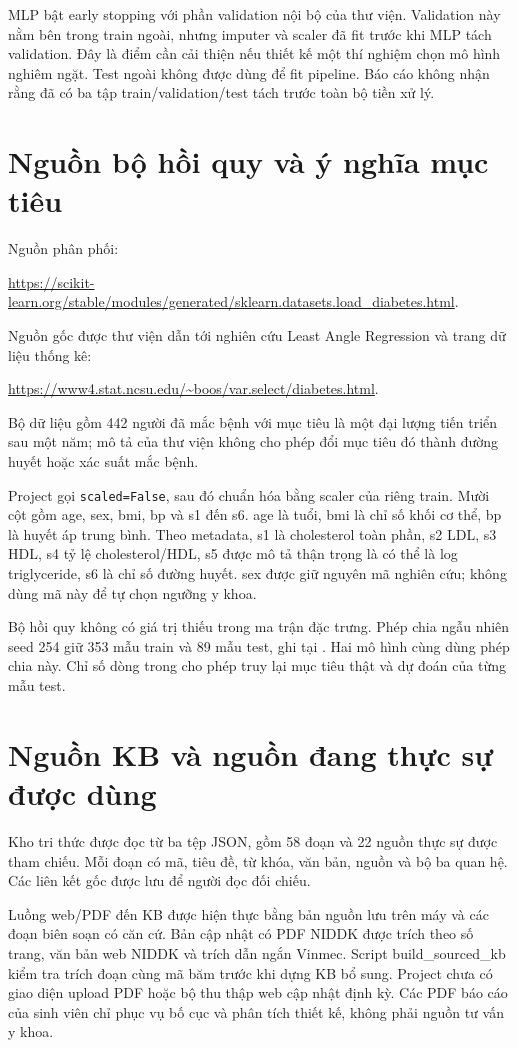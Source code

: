 MLP bật early stopping với phần validation nội bộ của thư viện. Validation này nằm bên trong train ngoài, nhưng imputer và scaler đã fit trước khi MLP tách validation. Đây là điểm cần cải thiện nếu thiết kế một thí nghiệm chọn mô hình nghiêm ngặt. Test ngoài không được dùng để fit pipeline. Báo cáo không nhận rằng đã có ba tập train/validation/test tách trước toàn bộ tiền xử lý.
\section{Nguồn bộ hồi quy và ý nghĩa mục tiêu}
Nguồn phân phối: \par\noindent\url{https://scikit-learn.org/stable/modules/generated/sklearn.datasets.load_diabetes.html}.\par  Nguồn gốc được thư viện dẫn tới nghiên cứu Least Angle Regression và trang dữ liệu thống kê: \par\noindent\url{https://www4.stat.ncsu.edu/~boos/var.select/diabetes.html}.\par  Bộ dữ liệu gồm 442 người đã mắc bệnh với mục tiêu là một đại lượng tiến triển sau một năm; mô tả của thư viện không cho phép đổi mục tiêu đó thành đường huyết hoặc xác suất mắc bệnh\cite{diabetes}.

Project gọi \texttt{scaled=False}, sau đó chuẩn hóa bằng scaler của riêng train. Mười cột gồm age, sex, bmi, bp và s1 đến s6. age là tuổi, bmi là chỉ số khối cơ thể, bp là huyết áp trung bình. Theo metadata, s1 là cholesterol toàn phần, s2 LDL, s3 HDL, s4 tỷ lệ cholesterol/HDL, s5 được mô tả thận trọng là có thể là log triglyceride, s6 là chỉ số đường huyết. sex được giữ nguyên mã nghiên cứu; không dùng mã này để tự chọn ngưỡng y khoa.

Bộ hồi quy không có giá trị thiếu trong ma trận đặc trưng. Phép chia ngẫu nhiên seed 254 giữ 353 mẫu train và 89 mẫu test, ghi tại . Hai mô hình cùng dùng phép chia này. Chỉ số dòng trong  cho phép truy lại mục tiêu thật và dự đoán của từng mẫu test.
\section{Nguồn KB và nguồn đang thực sự được dùng}

Kho tri thức được đọc từ ba tệp JSON, gồm 58 đoạn và 22 nguồn thực sự được tham chiếu. Mỗi đoạn có mã, tiêu đề, từ khóa, văn bản, nguồn và bộ ba quan hệ. Các liên kết gốc được lưu để người đọc đối chiếu.

Luồng web/PDF đến KB được hiện thực bằng bản nguồn lưu trên máy và các đoạn biên soạn có căn cứ. Bản cập nhật có PDF NIDDK được trích theo số trang, văn bản web NIDDK và trích dẫn ngắn Vinmec. Script build\_sourced\_kb kiểm tra trích đoạn cùng mã băm trước khi dựng KB bổ sung. Project chưa có giao diện upload PDF hoặc bộ thu thập web cập nhật định kỳ. Các PDF báo cáo của sinh viên chỉ phục vụ bố cục và phân tích thiết kế, không phải nguồn tư vấn y khoa.

